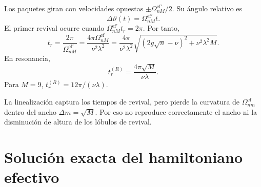 \documentclass[11pt]{article}
\begin{document}
Los paquetes giran con velocidades opuestas
$\pm\Omega_{nM}^{\mathrm{ef}\prime}/2$. Su \'angulo relativo es
\begin{equation}
  \Delta\vartheta(t)=\Omega_{nM}^{\mathrm{ef}\prime}t.
\end{equation}
El primer revival ocurre cuando
$\Omega_{nM}^{\mathrm{ef}\prime}t_r=2\pi$. Por tanto,
\begin{equation}
  \boxed{
  t_r
  =
  \frac{2\pi}{\Omega_{nM}^{\mathrm{ef}\prime}}
  =
  \frac{4\pi\Omega_{nM}^{\mathrm{ef}}}{\nu^2\lambda^2}
  =
  \frac{4\pi}{\nu^2\lambda^2}
  \sqrt{(2g\sqrt n-\nu)^2+\nu^2\lambda^2M}.
  }
\end{equation}
En resonancia,
\begin{equation}
  \boxed{
  t_r^{(R)}=\frac{4\pi\sqrt M}{\nu\lambda}.
  }
\end{equation}
Para $M=9$, $t_r^{(R)}=12\pi/(\nu\lambda)$.

La linealizaci\'on captura los tiempos de revival, pero pierde la curvatura de
$\Omega_{nm}^{\mathrm{ef}}$ dentro del ancho $\Delta m=\sqrt M$. Por eso no
reproduce correctamente el ancho ni la disminuci\'on de altura de los l\'obulos
de revival.

\section{Soluci\'on exacta del hamiltoniano efectivo}
\end{document}
